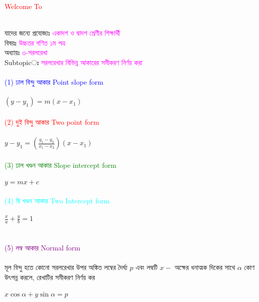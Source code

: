 \documentclass{article}
\begin{document}
 
	\Large
	\textcolor{red}{Welcome To} 
	\\
	\\
	যাদের জন্যে প্রযোজ্যঃ  	\textcolor{magenta}{একাদশ ও দ্বাদশ শ্রেণীর শিক্ষার্থী} \\
	বিষয়ঃ \textcolor{magenta}{উচ্চতর গণিত ১ম পত্র} \\
	অধ্যায়ঃ \textcolor{magenta}{৩-সরলরেখা}\\ 
	Subtopicঃ  \textcolor{magenta}{  সরলরেখার বিভিন্ন আকারের সমীকরণ নির্ণয় করা   }\\
	\\
	\textcolor{blue}{(1)	ঢাল বিন্দু আকার Point slope form}\\
	\\
	$(y-y_1)=m(x-x_1)$\\
	\\
	\textcolor{red} {(2)  দুই বিন্দু আকার 	Two point form}\\
	\\
	$y-y_1=\left(\frac{y_1-y_2}{x_1-x_2}\right)(x-x_1)$\\
	\\
	\textcolor{green}{ (3) ঢাল খণ্ডন আকার 	Slope intercept form}\\
	\\
	$y=mx+c$\\
	\\
	\textcolor{cyan}{ (4) দ্বি খণ্ডন আকার  Two	Intercept form}\\
	\\
	$\frac{x}{a}+\frac{y}{b}=1$\\
	\\
		\\
	\textcolor{purple}{ (5) লম্ব  আকার  Normal form}\\
	\\
	মূল বিন্দু হতে কোনো সরলরেখার উপর অঙ্কিত লম্বের দৈর্ঘ্য $p$ এবং লম্বটি $x-$ অক্ষের ধনাত্মক দিকের সাথে $\alpha$ কোণ উৎপন্ন করলে, রেখাটির সমীকরণ নির্ণয় কর \\ 
	\\
	$x\cos \alpha +y\sin \alpha=p$\\
	\\
\end{document}
